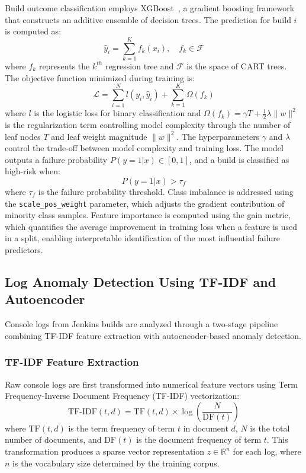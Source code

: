 \documentclass[sn-nature]{sn-jnl}
\theoremstyle{thmstyleone}
\theoremstyle{thmstyletwo}
\theoremstyle{thmstylethree}
\begin{document}
Build outcome classification employs XGBoost~\cite{chen2016xgboost}, a gradient boosting framework that constructs an additive ensemble of decision trees.
The prediction for build $i$ is computed as:
\begin{equation}
\hat{y}_i = \sum_{k=1}^{K} f_k(x_i), \quad f_k \in \mathcal{F}
\end{equation}
where $f_k$ represents the $k^{th}$ regression tree and $\mathcal{F}$ is the space of CART trees.
The objective function minimized during training is:
\begin{equation}\label{eq:xgboost_obj}
\mathcal{L} = \sum_{i=1}^{N} l(y_i, \hat{y}_i) + \sum_{k=1}^{K} \Omega(f_k)
\end{equation}
where $l$ is the logistic loss for binary classification and $\Omega(f_k) = \gamma T + \frac{1}{2}\lambda \|w\|^2$ is the regularization term controlling model complexity through the number of leaf nodes $T$ and leaf weight magnitude $\|w\|^2$.
The hyperparameters $\gamma$ and $\lambda$ control the trade-off between model complexity and training loss.
The model outputs a failure probability $P(y=1|x) \in [0, 1]$, and a build is classified as high-risk when:
\begin{equation}
P(y=1|x) > \tau_f
\end{equation}
where $\tau_f$ is the failure probability threshold.
Class imbalance is addressed using the \texttt{scale\_pos\_weight} parameter, which adjusts the gradient contribution of minority class samples.
Feature importance is computed using the gain metric, which quantifies the average improvement in training loss when a feature is used in a split, enabling interpretable identification of the most influential failure predictors.

\subsection{Log Anomaly Detection Using TF-IDF and Autoencoder}\label{subsec:loganomaly}

Console logs from Jenkins builds are analyzed through a two-stage pipeline combining TF-IDF feature extraction with autoencoder-based anomaly detection.

\subsubsection{TF-IDF Feature Extraction}
Raw console logs are first transformed into numerical feature vectors using Term Frequency-Inverse Document Frequency (TF-IDF) vectorization:
\begin{equation}
\text{TF-IDF}(t,d) = \text{TF}(t,d) \times \log \left(\frac{N}{\text{DF}(t)}\right)
\end{equation}
where $\text{TF}(t,d)$ is the term frequency of term $t$ in document $d$, $N$ is the total number of documents, and $\text{DF}(t)$ is the document frequency of term $t$.
This transformation produces a sparse vector representation $z \in \mathbb{R}^n$ for each log, where $n$ is the vocabulary size determined by the training corpus.
\end{document}
